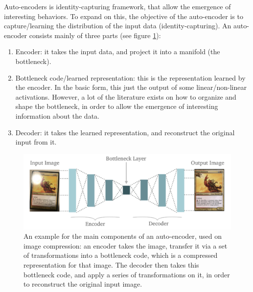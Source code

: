   \par Auto-encoders \citep{hinton2006reducing} is identity-capturing framework, that allow the emergence of interesting behaviors. To expand on this, the objective of the auto-encoder is to capture/learning the distribution of the input data (identity-capturing). An auto-encoder consists mainly of three parts (see figure \ref{fig:autoenc}):
  \begin{enumerate}
    \item Encoder: it takes the input data, and project it into a manifold (the bottleneck).
    \item Bottleneck code/learned representation: this is the representation learned by the encoder. In the basic form, this just the output of some linear/non-linear activations. However, a lot of the literature exists on how to organize and shape the bottleneck, in order to allow the emergence of interesting information about the data.
    \item Decoder: it takes the learned representation, and reconstruct the original input from it.
  \end{enumerate}

  \begin{figure}
    \centering
    \includegraphics[scale=0.8]{images/framework/autoencoder.png}
    \caption{An example for the main components of an auto-encoder, used on image compression: an encoder takes the image, transfer it via a set of transformations into a bottleneck code, which is a compressed representation for that image. The decoder then takes this bottleneck code, and apply a series of transformations on it, in order to reconstruct the original input image.}
    \label{fig:autoenc}
  \end{figure}


